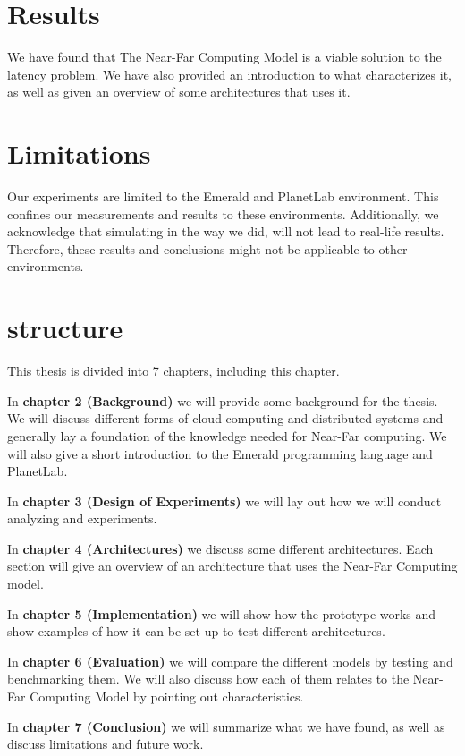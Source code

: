 \section{Results}
We have found that The Near-Far Computing Model is a viable solution to the latency problem. We have also provided an introduction to what characterizes it, as well as given an overview of some architectures that uses it.

\section{Limitations}
Our experiments are limited to the Emerald and PlanetLab environment. This confines our measurements and results to these environments. Additionally, we acknowledge that simulating in the way we did, will not lead to real-life results. Therefore, these results and conclusions might not be applicable to other environments.



\section{structure}
This thesis is divided into 7 chapters, including this chapter.

In \textbf{chapter 2 (Background)} we will provide some background for the thesis. We will discuss different forms of cloud computing and distributed systems and generally lay a foundation of the knowledge needed for Near-Far computing. We will also give a short introduction to the Emerald programming language and PlanetLab.

In \textbf{chapter 3 (Design of Experiments)} we will lay out how we will conduct analyzing and experiments.

In \textbf{chapter 4 (Architectures)} we discuss some different architectures. Each section will give an overview of an architecture that uses the Near-Far Computing model.

In \textbf{chapter 5 (Implementation)} we will show how the prototype works and show examples of how it can be set up to test different architectures.

In \textbf{chapter 6 (Evaluation)} we will compare the different models by testing and benchmarking them. We will also discuss how each of them relates to the Near-Far Computing Model by pointing out characteristics.

In \textbf{chapter 7 (Conclusion)} we will summarize what we have found, as well as discuss limitations and future work.

